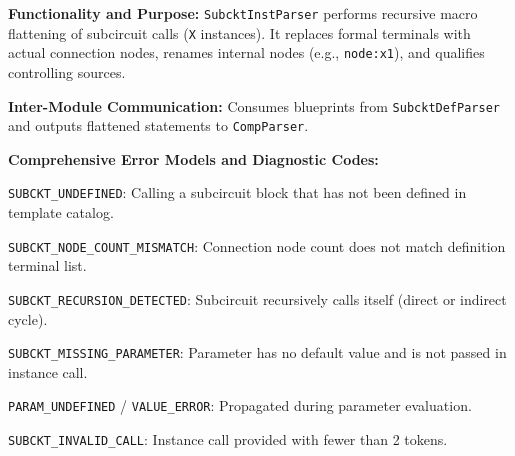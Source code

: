 \textbf{Functionality and Purpose:} \texttt{SubcktInstParser} performs recursive macro flattening of subcircuit calls (\texttt{X} instances). It replaces formal terminals with actual connection nodes, renames internal nodes (e.g., \texttt{node:x1}), and qualifies controlling sources.

\textbf{Inter-Module Communication:} Consumes blueprints from \texttt{SubcktDefParser} and outputs flattened statements to \texttt{CompParser}.

\textbf{Comprehensive Error Models and Diagnostic Codes:}
\begin{compactitem}
    \item \texttt{SUBCKT\_UNDEFINED}: Calling a subcircuit block that has not been defined in template catalog.
    \item \texttt{SUBCKT\_NODE\_COUNT\_MISMATCH}: Connection node count does not match definition terminal list.
    \item \texttt{SUBCKT\_RECURSION\_DETECTED}: Subcircuit recursively calls itself (direct or indirect cycle).
    \item \texttt{SUBCKT\_MISSING\_PARAMETER}: Parameter has no default value and is not passed in instance call.
    \item \texttt{PARAM\_UNDEFINED} / \texttt{VALUE\_ERROR}: Propagated during parameter evaluation.
    \item \texttt{SUBCKT\_INVALID\_CALL}: Instance call provided with fewer than 2 tokens.
\end{compactitem}

